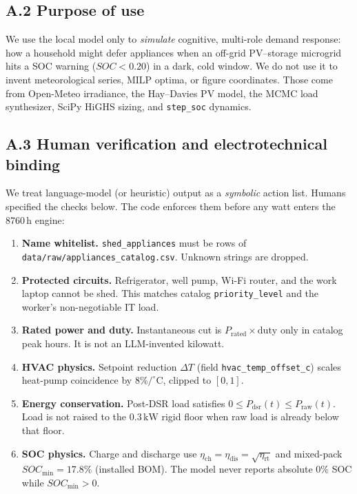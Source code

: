 \subsection*{A.2 Purpose of use}

We use the local model only to \emph{simulate} cognitive, multi-role
demand response: how a household might defer appliances when an
off-grid PV--storage microgrid hits a SOC warning (\(SOC<0.20\)) in a
dark, cold window. We do not use it to invent meteorological series,
MILP optima, or figure coordinates. Those come from Open-Meteo
irradiance, the Hay--Davies PV model, the MCMC load synthesizer, SciPy
HiGHS sizing, and \texttt{step\_soc} dynamics.

\subsection*{A.3 Human verification and electrotechnical binding}

We treat language-model (or heuristic) output as a \emph{symbolic}
action list. Humans specified the checks below. The code enforces them
before any watt enters the 8760\,h engine:

\begin{enumerate}
  \item \textbf{Name whitelist.}
        \texttt{shed\_appliances} must be rows of
        \texttt{data/raw/appliances\_catalog.csv}.
        Unknown strings are dropped.
  \item \textbf{Protected circuits.}
        Refrigerator, well pump, Wi-Fi router, and the work laptop
        cannot be shed. This matches catalog \texttt{priority\_level}
        and the worker's non-negotiable IT load.
  \item \textbf{Rated power and duty.}
        Instantaneous cut is
        \(P_{\mathrm{rated}}\times\mathrm{duty}\)
        only in catalog peak hours. It is not an LLM-invented kilowatt.
  \item \textbf{HVAC physics.}
        Setpoint reduction \(\Delta T\) (field
        \texttt{hvac\_temp\_offset\_c}) scales heat-pump coincidence
        by \(8\%/^{\circ}\mathrm{C}\), clipped to \([0,1]\).
  \item \textbf{Energy conservation.}
        Post-DSR load satisfies
        \(0 \le P_{\mathrm{dsr}}(t) \le P_{\mathrm{raw}}(t)\).
        Load is not raised to the $0.3\,\mathrm{kW}$ rigid floor when
        raw load is already below that floor.
  \item \textbf{SOC physics.}
        Charge and discharge use
        \(\eta_{\mathrm{ch}}=\eta_{\mathrm{dis}}=\sqrt{\eta_{\mathrm{rt}}}\)
        and mixed-pack \(SOC_{\min}=17.8\%\) (installed BOM).
        The model never reports absolute $0\%$ SOC while
        \(SOC_{\min}>0\).
\end{enumerate}

